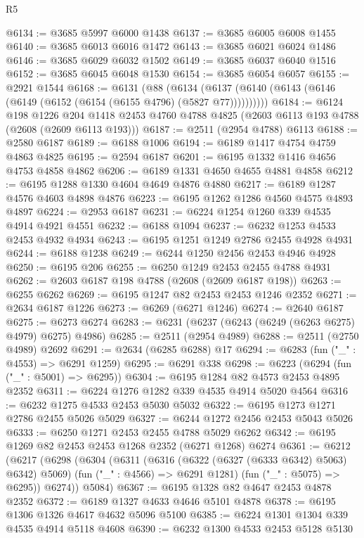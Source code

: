 \begin{lexlean}{R5}
\begin{coremodule}
@6134 := @3685 @5997 @6000 @1438
@6137 := @3685 @6005 @6008 @1455
@6140 := @3685 @6013 @6016 @1472
@6143 := @3685 @6021 @6024 @1486
@6146 := @3685 @6029 @6032 @1502
@6149 := @3685 @6037 @6040 @1516
@6152 := @3685 @6045 @6048 @1530
@6154 := @3685 @6054 @6057
@6155 := @2921 @1544
@6168 := @6131
    (@88 (@6134 (@6137 (@6140 (@6143 (@6146 (@6149 (@6152 (@6154 (@6155 @4796) (@5827 @77))))))))))
@6184 := @6124
    @198
    @1226
    @204
    @1418
    @2453
    @4760
    @4788
    @4825
    (@2603 @6113 @193 @4788 (@2608 (@2609 @6113 @193)))
@6187 := @2511 (@2954 @4788) @6113
@6188 := @2580 @6187
@6189 := @6188 @1006
@6194 := @6189 @1417 @4754 @4759 @4863 @4825
@6195 := @2594 @6187
@6201 := @6195 @1332 @1416 @4656 @4753 @4858 @4862
@6206 := @6189 @1331 @4650 @4655 @4881 @4858
@6212 := @6195 @1288 @1330 @4604 @4649 @4876 @4880
@6217 := @6189 @1287 @4576 @4603 @4898 @4876
@6223 := @6195 @1262 @1286 @4560 @4575 @4893 @4897
@6224 := @2953 @6187
@6231 := @6224 @1254 @1260 @339 @4535 @4914 @4921 @4551
@6232 := @6188 @1094
@6237 := @6232 @1253 @4533 @2453 @4932 @4934
@6243 := @6195 @1251 @1249 @2786 @2455 @4928 @4931
@6244 := @6188 @1238
@6249 := @6244 @1250 @2456 @2453 @4946 @4928
@6250 := @6195 @206
@6255 := @6250 @1249 @2453 @2455 @4788 @4931
@6262 := @2603 @6187 @198 @4788 (@2608 (@2609 @6187 @198))
@6263 := @6255 @6262
@6269 := @6195 @1247 @82 @2453 @2453 @1246 @2352
@6271 := @2634 @6187 @1226
@6273 := @6269 (@6271 @1246)
@6274 := @2640 @6187
@6275 := @6273 @6274
@6283 := @6231 (@6237 (@6243 (@6249 (@6263 @6275) @4979) @6275) @4986)
@6285 := @2511 (@2954 @4989)
@6288 := @2511 (@2750 @4989) @2692
@6291 := @2634 (@6285 @6288) @17
@6294 := @6283 (fun ("_" : @4553) => @6291 @1259)
@6295 := @6291 @338
@6298 := @6223 (@6294 (fun ("_" : @5001) => @6295))
@6304 := @6195 @1284 @82 @4573 @2453 @4895 @2352
@6311 := @6224 @1276 @1282 @339 @4535 @4914 @5020 @4564
@6316 := @6232 @1275 @4533 @2453 @5030 @5032
@6322 := @6195 @1273 @1271 @2786 @2455 @5026 @5029
@6327 := @6244 @1272 @2456 @2453 @5043 @5026
@6333 := @6250 @1271 @2453 @2455 @4788 @5029 @6262
@6342 := @6195 @1269 @82 @2453 @2453 @1268 @2352 (@6271 @1268) @6274
@6361 := @6212
    (@6217
      (@6298
        (@6304
          (@6311
            (@6316 (@6322 (@6327 (@6333 @6342) @5063) @6342) @5069)
            (fun ("_" : @4566) => @6291 @1281)
            (fun ("_" : @5075) => @6295))
          @6274))
      @5084)
@6367 := @6195 @1328 @82 @4647 @2453 @4878 @2352
@6372 := @6189 @1327 @4633 @4646 @5101 @4878
@6378 := @6195 @1306 @1326 @4617 @4632 @5096 @5100
@6385 := @6224 @1301 @1304 @339 @4535 @4914 @5118 @4608
@6390 := @6232 @1300 @4533 @2453 @5128 @5130

\end{coremodule}
\end{lexlean}
